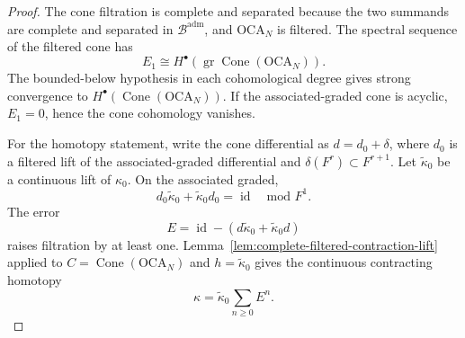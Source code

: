 \begin{proof}
The cone filtration is complete and separated because the two summands
are complete and separated in \(\mathcal B^{\mathrm{adm}}\), and
\(\mathrm{OCA}_N\) is filtered.  The spectral sequence of the filtered
cone has
\[
  E_1\cong
  H^\bullet\!\left(
    \operatorname{gr}\operatorname{Cone}(\mathrm{OCA}_N)
  \right).
\]
The bounded-below hypothesis in each cohomological degree gives strong
convergence to
\(H^\bullet(\operatorname{Cone}(\mathrm{OCA}_N))\).  If the
associated-graded cone is acyclic, \(E_1=0\), hence the cone cohomology
vanishes.

For the homotopy statement, write the cone differential as
\(d=d_0+\delta\), where \(d_0\) is a filtered lift of the
associated-graded differential and \(\delta(F^r)\subset F^{r+1}\).
Let \(\widetilde\kappa_0\) be a continuous lift of \(\kappa_0\).  On the
associated graded,
\[
  d_0\widetilde\kappa_0+\widetilde\kappa_0d_0=\operatorname{id}
  \quad\text{mod }F^1.
\]
The error
\[
  E=\operatorname{id}-
  (d\widetilde\kappa_0+\widetilde\kappa_0d)
\]
raises filtration by at least one.  Lemma~\ref{lem:complete-filtered-contraction-lift}
applied to \(C=\operatorname{Cone}(\mathrm{OCA}_N)\) and
\(h=\widetilde\kappa_0\) gives the continuous contracting homotopy
\[
  \kappa=\widetilde\kappa_0\sum_{n\ge0}E^n .
\]
\end{proof}

